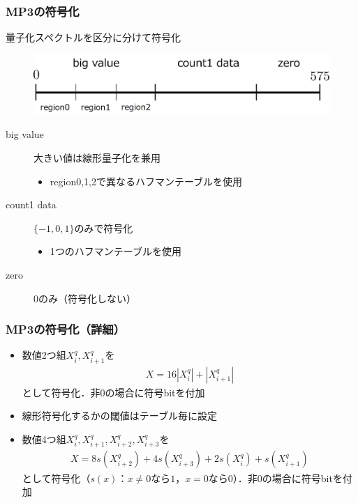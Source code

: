 \documentclass[14pt,xcolor=dvipsnames,table,dvipdfmx]{beamer}
\begin{document}
\begin{frame}[c]
    \frametitle{MP3の符号化}
    量子化スペクトルを区分に分けて符号化
    \begin{figure}
        \includegraphics[width=115mm]{./figs/huffman_coding_region_division.png}
    \end{figure}
    \begin{description}
        \item[big value] 大きい値は線形量子化を兼用
            \begin{itemize}
                \item region0,1,2で異なるハフマンテーブルを使用
            \end{itemize}
        \item[count1 data] $\{ -1, 0, 1 \}$のみで符号化
            \begin{itemize}
                \item 1つのハフマンテーブルを使用
            \end{itemize}
        \item[zero] $0$のみ（符号化しない）
    \end{description}
\end{frame}

\begin{frame}[c]
    \frametitle{MP3の符号化（詳細）}
    \begin{itemize}
        \item 数値2つ組$X_{i}^{q}, X_{i+1}^{q}$を
            \begin{align}
                X = 16 |X_{i}^{q}| + |X_{i+1}^{q}|
            \end{align}
            として符号化．非$0$の場合に符号bitを付加
        \item 線形符号化するかの閾値はテーブル毎に設定
    \end{itemize}
    \begin{itemize}
        \item 数値4つ組$X_{i}^{q}, X_{i+1}^{q}, X_{i+2}^{q}, X_{i+3}^{q}$を
            \begin{align}
                X = 8 s(X_{i+2}^{q}) + 4 s(X_{i+3}^{q}) + 2 s(X_{i}^{q}) + s(X_{i+1}^{q})
            \end{align}
            として符号化（$s(x)$：$x\neq 0$なら$1$，$x=0$なら$0$）．非$0$の場合に符号bitを付加
    \end{itemize}
\end{frame}
\end{document}
